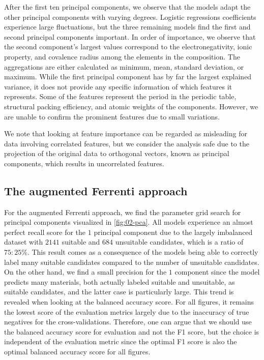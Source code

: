 After the first ten principal components, we observe that the models adapt the other principal components with varying degrees. Logistic regressions coefficients experience large fluctuations, but the three remaining models find the first and second principal components important. In order of importance, we observe that the second component's largest values correspond to the electronegativity, ionic property, and covalence radius among the elements in the composition. The aggregations are either calculated as minimum, mean, standard deviation, or maximum. While the first principal component has by far the largest explained variance, it does not provide any specific information of which features it represents. Some of the features represent the period in the periodic table, structural packing efficiency, and atomic weights of the components. However, we are unable to confirm the prominent features due to small variations.


We note that looking at feature importance can be regarded as misleading for data involving correlated features, but we consider the analysis safe due to the projection of the original data to orthogonal vectors, known as principal components, which results in uncorrelated features.



\subsection{The augmented Ferrenti approach}

For the augmented Ferrenti approach, we find the parameter grid search for principal components visualized in \autoref{fig:02-pca}. All models experience an almost perfect recall score for the $1$ principal component due to the largely imbalanced dataset with $2141$ suitable and $684$ unsuitable candidates, which is a ratio of $75:25 \%$. This result comes as a consequence of the models being able to correctly label many suitable candidates compared to the number of unsuitable candidates. On the other hand, we find a small precision for the $1$ component since the model predicts many materials, both actually labeled suitable and unsuitable, as suitable candidates, and the latter case is particularly large. This trend is revealed when looking at the balanced accuracy score. For all figures, it remains the lowest score of the evaluation metrics largely due to the inaccuracy of true negatives for the cross-validations. Therefore, one can argue that we should use the balanced accuracy score for evaluation and not the F1 score, but the choice is independent of the evaluation metric since the optimal F1 score is also the optimal balanced accuracy score for all figures.


